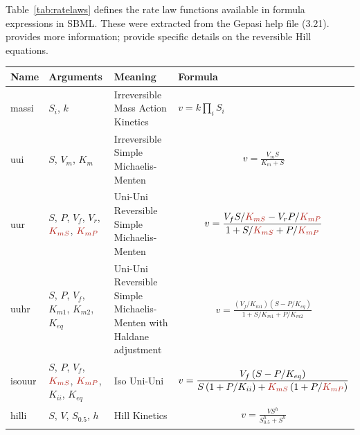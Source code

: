 \documentclass[10pt]{cekarticle}
\newcommand{\changed}[1]{\textcolor{BrickRed}{#1}}
\begin{document}
Table~\ref{tab:ratelaws} defines the rate law functions available in
formula expressions in SBML.  These were extracted from the Gepasi help
file (3.21).  \citet{segel:1993} provides more information;
\citet{hofmeyr:1997} provide specific details on the reversible Hill
equations.

\begin{table}[ht]
\setlength{\abovedisplayskip}{1pt}
\setlength{\belowdisplayskip}{1pt}
\begin{tabular}{|m{0.5in}|>{\raggedright}m{0.7in}|>{\raggedright}m{1.2in}|m{3.2in}|}
\hline
\textbf{Name} & \textbf{Arguments} & \textbf{Meaning} &
\textbf{Formula} \\
\hline

massi & $S_i$, $k$ & Irreversible Mass Action Kinetics &
$v = k \prod_i S_i$
\\ \hline

uui & $S$, $V_m$, $K_m$ & Irreversible Simple Michaelis-Menten  &
\begin{gather*}
v = \frac{V_m S}{K_m + S}
\end{gather*}
\\ \hline

uur & $S$, $P$, $V_f$, $V_r$, $\changed{K_{mS}}$, $\changed{K_{mP}}$ & Uni-Uni Reversible Simple
Michaelis-Menten &
\begin{gather*}
v = \frac{V_f S /\changed{K_{mS}} - V_r  P / \changed{K_{mP}}}{1 + S / \changed{K_{mS}} +
P / \changed{K_{mP}} }
\end{gather*}
\\ \hline

uuhr & $S$, $P$, $V_f$, $K_{m1}$, $K_{m2}$, $K_{eq}$ & Uni-Uni
Reversible Simple Michaelis-Menten with Haldane adjustment &
\begin{gather*}
v = \frac{\left( V_f / K_{m1} \right) \left(S -
P / K_{eq} \right)}{1 + S / K_{m1} + P / K_{m2}}
\end{gather*}
\\ \hline

isouur & $S$, $P$, $V_f$, $\changed{K_{mS}}$, $\changed{K_{mP}}$, $K_{ii}$, $K_{eq}$ & Iso Uni-Uni &
\begin{gather*}
v = \frac{V_f \left(S - P/ K_{eq}\right)}{S \left(1
+ P/ K_{ii}\right) + \changed{K_{mS}} \left(1 + P / \changed{K_{mP}}\right)}
\end{gather*}
\\ \hline

hilli & $S$, $V$, $S_{0.5}$, $h$ & Hill Kinetics &
\begin{gather*}
v = \frac{V S^h}{S_{0.5}^h + S^h}
\end{gather*}
\\ \hline


\end{tabular}
\end{table}
\end{document}
